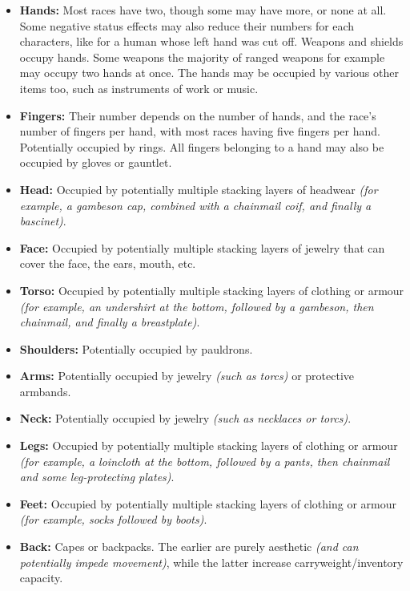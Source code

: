 \documentclass[openany,11pt,a4paper]{book}
\begin{document}
\begin{itemize}
\item \textbf{Hands:} Most races have two, though some may have more, or none at all. Some negative status effects may also reduce their numbers for each characters, like for a human whose left hand was cut off. Weapons and shields occupy hands. Some weapons \textemdash the majority of ranged weapons for example \textemdash may occupy two hands at once. The hands may be occupied by various other items too, such as instruments of work or music.
\item \textbf{Fingers:} Their number depends on the number of hands, and the race's number of fingers per hand, with most races having five fingers per hand. Potentially occupied by rings. All fingers belonging to a hand may also be occupied by gloves or gauntlet.
\item \textbf{Head:} Occupied by potentially multiple stacking layers of headwear \textit{(for example, a gambeson cap, combined with a chainmail coif, and finally a bascinet)}.
\item \textbf{Face:} Occupied by potentially multiple stacking layers of jewelry that can cover the face, the ears, mouth, etc.
\item \textbf{Torso:} Occupied by potentially multiple stacking layers of clothing or armour \textit{(for example, an undershirt at the bottom, followed by a gambeson, then chainmail, and finally a breastplate)}.
\item \textbf{Shoulders:} Potentially occupied by pauldrons.
\item \textbf{Arms:} Potentially occupied by jewelry \textit{(such as torcs)} or protective armbands.
\item \textbf{Neck:} Potentially occupied by jewelry \textit{(such as necklaces or torcs)}.
\item \textbf{Legs:} Occupied by potentially multiple stacking layers of clothing or armour \textit{(for example, a loincloth at the bottom, followed by a pants, then chainmail and some leg-protecting plates)}.
\item \textbf{Feet:} Occupied by potentially multiple stacking layers of clothing or armour \textit{(for example, socks followed by boots)}.
\item \textbf{Back:} Capes or backpacks. The earlier are purely aesthetic \textit{(and can potentially impede movement)}, while the latter increase carryweight/inventory capacity.
\end{itemize}
\end{document}
